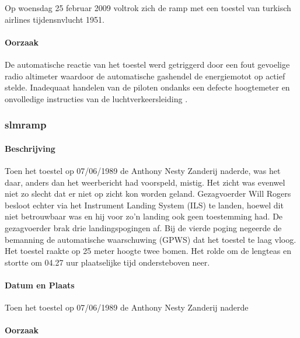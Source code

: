 \documentclass{article}
\begin{document}
	\newline \indent  Op woensdag 25 februar 2009 voltrok zich de  ramp met een toestel van turkisch airlines tijdensnvlucht 1951.
	\paragraph{Oorzaak}
	De automatische reactie van het toestel werd getriggerd door een fout gevoelige radio altimeter waardoor de automatische gashendel de energiemotot op actief stelde.
	Inadequaat handelen van de piloten ondanks een defecte hoogtemeter en onvolledige instructies van de luchtverkeersleiding
	\cite{zuilen23022019Tijdlijnpoldercrash}
	\cite{wikinews04032009techfoutailines1951}
	\cite{luchtvaartnieuws21012020boeing737conclusies}
	\cite{adformatie280220209communicatiegebreken}
	\cite{spinnael25022009onderzoekpolderbaancrash}
	\cite{crashTurkishAirlines}
	\cite{flightradar24}
	\cite{flightstatstracker}. 
	\subsubsection{slmramp}
			\paragraph{Beschrijving}
				Toen het toestel op 07/06/1989 de Anthony Nesty Zanderij naderde, was het daar, anders dan het weerbericht had voorspeld, mistig. Het zicht was evenwel niet zo slecht dat er niet op zicht kon worden geland. Gezagvoerder Will Rogers besloot echter via het Instrument Landing System (ILS) te landen, hoewel dit niet betrouwbaar was en hij voor zo'n landing ook geen toestemming had. De gezagvoerder brak drie landingspogingen af. Bij de vierde poging negeerde de bemanning de automatische waarschuwing (GPWS) dat het toestel te laag vloog. Het toestel raakte op 25 meter hoogte twee bomen. Het rolde om de lengteas en stortte om 04.27 uur plaatselijke tijd ondersteboven neer.
	\paragraph{Datum en Plaats}
 	Toen het toestel op 07/06/1989 de Anthony Nesty Zanderij naderde
	\paragraph{Oorzaak}
	\newline \indent
\end{document}
